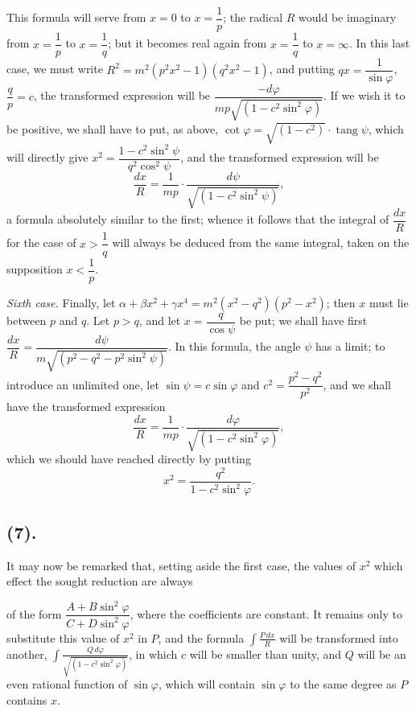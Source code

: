 \documentclass{article}
\begin{document}
This formula will serve from $x=0$ to $x=\dfrac{1}{p}$; the radical $R$ would be imaginary from $x=\dfrac{1}{p}$ to $x=\dfrac{1}{q}$; but it becomes real again from $x=\dfrac{1}{q}$ to $x=\infty$. In this last case, we must write $R^{2}=m^{2}(p^{2}x^{2}-1)(q^{2}x^{2}-1)$, and putting $qx=\dfrac{1}{\sin\varphi}$, $\dfrac{q}{p}=c$, the transformed expression will be $\dfrac{-d\varphi}{mp\sqrt{(1-c^{2}\sin^{2}\varphi)}}$. If we wish it to be positive, we shall have to put, as above, $\cot\varphi=\sqrt{(1-c^{2})}\cdot\operatorname{tang}\psi$, which will directly give $x^{2}=\dfrac{1-c^{2}\sin^{2}\psi}{q^{2}\cos^{2}\psi}$, and the transformed expression will be
\[ \frac{dx}{R}=\frac{1}{mp}\cdot\frac{d\psi}{\sqrt{(1-c^{2}\sin^{2}\psi)}}, \]
a formula absolutely similar to the first; whence it follows that the integral of $\dfrac{dx}{R}$ for the case of $x>\dfrac{1}{q}$ will always be deduced from the same integral, taken on the supposition $x<\dfrac{1}{p}$.

\emph{Sixth case.} Finally, let $\alpha+\beta x^{2}+\gamma x^{4}=m^{2}(x^{2}-q^{2})(p^{2}-x^{2})$; then $x$ must lie between $p$ and $q$. Let $p>q$, and let $x=\dfrac{q}{\cos\psi}$ be put; we shall have first $\dfrac{dx}{R}=\dfrac{d\psi}{m\sqrt{(p^{2}-q^{2}-p^{2}\sin^{2}\psi)}}$. In this formula, the angle $\psi$ has a limit; to introduce an unlimited one, let $\sin\psi=c\sin\varphi$ and $c^{2}=\dfrac{p^{2}-q^{2}}{p^{2}}$, and we shall have the transformed expression
\[ \frac{dx}{R}=\frac{1}{mp}\cdot\frac{d\varphi}{\sqrt{(1-c^{2}\sin^{2}\varphi)}}, \]
which we should have reached directly by putting
\[ x^{2}=\frac{q^{2}}{1-c^{2}\sin^{2}\varphi}. \]

\subsection*{(7).}

It may now be remarked that, setting aside the first case, the values of $x^{2}$ which effect the sought reduction are always

of the form $\dfrac{A+B\sin^{2}\varphi}{C+D\sin^{2}\varphi}$, where the coefficients are constant. It remains only to substitute this value of $x^{2}$ in $P$, and the formula $\displaystyle\int\frac{P\,dx}{R}$ will be transformed into another, $\displaystyle\int\frac{Q\,d\varphi}{\sqrt{(1-c^{2}\sin^{2}\varphi)}}$, in which $c$ will be smaller than unity, and $Q$ will be an even rational function of $\sin\varphi$, which will contain $\sin\varphi$ to the same degree as $P$ contains $x$.
\end{document}
